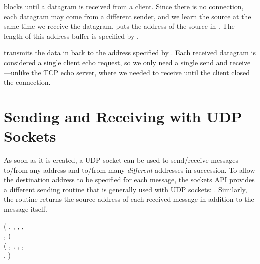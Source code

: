 \begin{topcode}
\begin{bottomcode}


 blocks until a datagram is received from a
client.  Since there is no connection, each datagram may come from
a different sender, and we learn the source at the same time
we receive the datagram.  puts
the address of the source in .  The length
of this address buffer is specified by .


 transmits the data in  back
to the address specified by .  Each received
datagram is considered a single client echo request,
so we only need a single send and receive---unlike the TCP echo server,
where we needed to receive until the client closed the connection.

\end{bottomcode}

\end{topcode}

\section{Sending and Receiving with UDP Sockets}
\label{sect:udpsendrcv}%

As soon as it is created, a UDP socket can be used to send/receive
messages to/from any address and to/from many \emph{different}
addresses in succession.  To allow the
destination address to be specified for each message,
the sockets API provides a different sending routine
that is generally used with UDP sockets: .
Similarly, the  routine returns the
source address of each received message in addition to the message
itself.
\begin{inlinefcn}
 ( ,
,  , 
 ,\\
\hspace*{2in} , 
 ) \\
 ( ,
,  , 
 ,\\
\hspace*{2in} , 
)
\end{inlinefcn}

